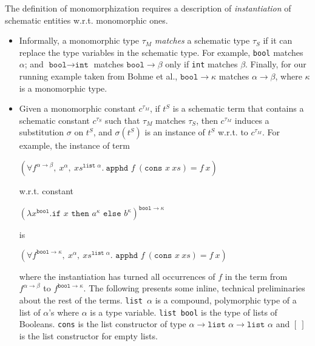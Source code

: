 \documentclass{article}
\begin{document}
		The definition of monomorphization 
		requires a description of 
		\textit{instantiation} of schematic 
		entities w.r.t. 
		monomorphic ones.
		\begin{itemize}
		\item Informally, a monomorphic type 
			$\tau_M$ \textit{matches} a schematic 
			type $\tau_S$ if it can replace the 
			type variables in the schematic 
			type. For example, \texttt{bool} 
			matches $\alpha$; and $\texttt{bool} 
			\to \texttt{int}$ matches 
			$\texttt{bool} \to \beta$
			only if \texttt{int} matches 
			$\beta$. Finally, for our running 
			example taken from Bohme et al., 
			${\texttt{bool} \to \kappa}$
			matches $\alpha \to \beta$,
			where $\kappa$ is a monomorphic
			type. 
			
		\item Given a monomorphic constant 
			$c^{\tau_M}$,  if $t^S$ is a 
			schematic term that contains a 
			schematic constant $c^{\tau_S}$ 
			such that $\tau_M$ matches 
			$\tau_S$, then $c^{\tau_M}$ induces 
			a substitution $\sigma$ on $t^S$, 
			and $\sigma(t^S)$ is an instance of 
			$t^S$ w.r.t. to $c^{\tau_M}$. 
			For example, the instance of term
			\begin{center}
				$(\forall f^{\alpha \to \beta},\ 
				x^{\alpha},\ xs^{\texttt{list }
				\alpha}.\ \texttt{apphd }f\ 
				(\texttt{cons }x\ xs) = f\ x)$
			\end{center} 
			w.r.t. constant
			\begin{center}
				$(\lambda x^{\texttt{bool}}.
				\texttt{if }x\texttt{ then }
				a^{\kappa} \texttt{ else }
				b^{\kappa})^{\texttt{bool} \to 
				\kappa}$ 
			\end{center}
			is
			\begin{center}
				$(\forall f^{\texttt{bool} 
				\to \kappa},\ x^{\alpha},\ 
				xs^{\texttt{list }\alpha}. 
				\texttt{ apphd }f\ (\texttt{cons }
				x \ xs) = f\ x)$
			\end{center}
			where the instantiation 
			has turned all occurrences of $f$ 
			in the term from $f^{\alpha \to \beta}$ 
			to $f^{\texttt{bool} \to \kappa}$.
			The following presents some inline, 
			technical preliminaries about 
			the rest of the terms.
			\texttt{list $\alpha$} is a compound,
			polymorphic type of a list of 
			$\alpha$'s where $\alpha$ is a type 
			variable. \texttt{list bool} is the 
			type of lists of Booleans. \texttt{cons} 
			is the list constructor of type 
			$\alpha \to \texttt{list }\alpha \to 
			\texttt{list }\alpha$ and $[\ ]$ is 
			the list constructor for empty lists. 

\end{itemize}
\end{document}

